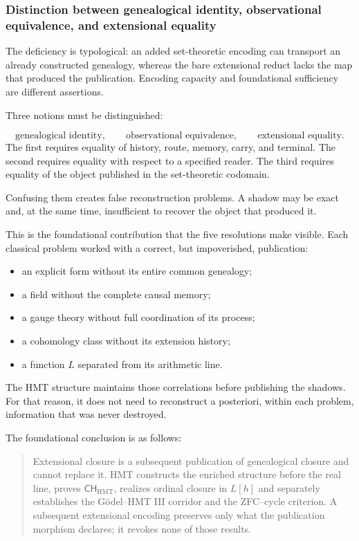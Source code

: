 \subsubsection{Distinction between genealogical identity, observational equivalence, and extensional equality}
The deficiency is typological: an added set-theoretic encoding can transport an already constructed genealogy, whereas the bare extensional reduct lacks the map that produced the publication. Encoding capacity and foundational sufficiency are different assertions.\par
Three notions must be distinguished:\par
\[
\text{genealogical identity},
\qquad
\text{observational equivalence},
\qquad
\text{extensional equality}.
\]
The first requires equality of history, route, memory, carry, and terminal. The second requires equality with respect to a specified reader. The third requires equality of the object published in the set-theoretic codomain.\par
Confusing them creates false reconstruction problems. A shadow may be exact and, at the same time, insufficient to recover the object that produced it.\par
This is the foundational contribution that the five resolutions make visible. Each classical problem worked with a correct, but impoverished, publication:\par
\begin{itemize}
\item an explicit form without its entire common genealogy;
\item a field without the complete causal memory;
\item a gauge theory without full coordination of its process;
\item a cohomology class without its extension history;
\item a function \(L\) separated from its arithmetic line.
\end{itemize}
The HMT structure maintains those correlations before publishing the shadows. For that reason, it does not need to reconstruct a posteriori, within each problem, information that was never destroyed.\par
The foundational conclusion is as follows:\par
\begin{quote}
Extensional closure is a subsequent publication of genealogical closure and cannot replace it. HMT constructs the enriched structure before the real line, proves \(\mathsf{CH}_{\mathrm{HMT}}\), realizes ordinal closure in \(L[h]\) and separately establishes the Gödel--HMT III corridor and the ZFC--cycle criterion. A subsequent extensional encoding preserves only what the publication morphism declares; it revokes none of those results.\par
\end{quote}

